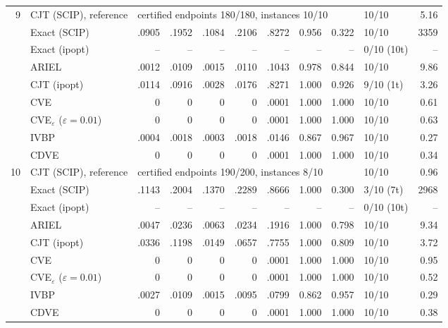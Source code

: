 \begin{table}[htbp]
\begin{tabular}{rlrrrrrrrlr}
\midrule
9 & CJT (SCIP), reference & \multicolumn{7}{l}{certified endpoints 180/180, instances 10/10} & 10/10 & 5.16 \\
 & Exact (SCIP) & .0905 & .1952 & .1084 & .2106 & .8272 & 0.956 & 0.322 & 10/10 & 3359 \\
 & Exact (ipopt) & -- & -- & -- & -- & -- & -- & -- & 0/10 (10t) & -- \\
 & ARIEL & .0012 & .0109 & .0015 & .0110 & .1043 & 0.978 & 0.844 & 10/10 & 9.86 \\
 & CJT (ipopt) & .0114 & .0916 & .0028 & .0176 & .8271 & 1.000 & 0.926 & 9/10 (1t) & 3.26 \\
 & CVE & 0 & 0 & 0 & 0 & .0001 & 1.000 & 1.000 & 10/10 & 0.61 \\
 & CVE$_\varepsilon$ ($\varepsilon{=}0.01$) & 0 & 0 & 0 & 0 & .0001 & 1.000 & 1.000 & 10/10 & 0.63 \\
 & IVBP & .0004 & .0018 & .0003 & .0018 & .0146 & 0.867 & 0.967 & 10/10 & 0.27 \\
 & CDVE & 0 & 0 & 0 & 0 & .0001 & 1.000 & 1.000 & 10/10 & 0.34 \\
\midrule
10 & CJT (SCIP), reference & \multicolumn{7}{l}{certified endpoints 190/200, instances 8/10} & 10/10 & 0.96 \\
 & Exact (SCIP) & .1143 & .2004 & .1370 & .2289 & .8666 & 1.000 & 0.300 & 3/10 (7t) & 2968 \\
 & Exact (ipopt) & -- & -- & -- & -- & -- & -- & -- & 0/10 (10t) & -- \\
 & ARIEL & .0047 & .0236 & .0063 & .0234 & .1916 & 1.000 & 0.798 & 10/10 & 9.34 \\
 & CJT (ipopt) & .0336 & .1198 & .0149 & .0657 & .7755 & 1.000 & 0.809 & 10/10 & 3.72 \\
 & CVE & 0 & 0 & 0 & 0 & .0001 & 1.000 & 1.000 & 10/10 & 0.95 \\
 & CVE$_\varepsilon$ ($\varepsilon{=}0.01$) & 0 & 0 & 0 & 0 & .0001 & 1.000 & 1.000 & 10/10 & 0.52 \\
 & IVBP & .0027 & .0109 & .0015 & .0095 & .0799 & 0.862 & 0.957 & 10/10 & 0.29 \\
 & CDVE & 0 & 0 & 0 & 0 & .0001 & 1.000 & 1.000 & 10/10 & 0.38 \\
\bottomrule
\end{tabular}
\end{table}
